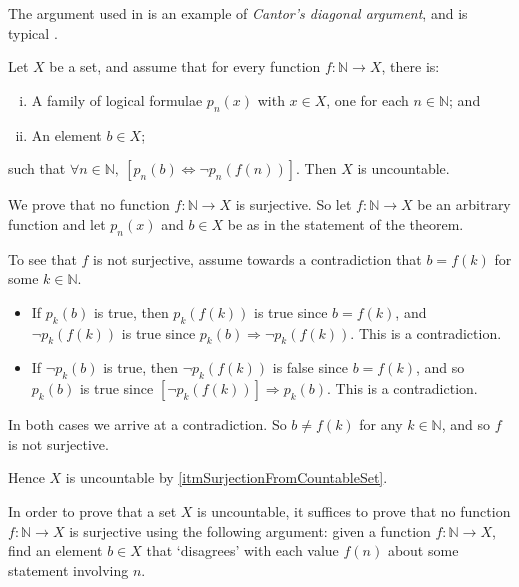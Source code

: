 The argument used in  is an example of \textit{Cantor's diagonal argument}, and is typical .

\begin{theorem}
\label{thmCantorDiagonalGeneral}
Let $X$ be a set, and assume that for every function $f : \mathbb{N} \to X$, there is:
\begin{enumerate}[(i)]
\item A family of logical formulae $p_n(x)$ with $x \in X$, one for each $n \in \mathbb{N}$; and
\item An element $b \in X$;
\end{enumerate}
such that $\forall n \in \mathbb{N},~ [p_n(b) \Leftrightarrow \neg p_n(f(n))]$. Then $X$ is uncountable.
\end{theorem}

\begin{cproof}
We prove that no function $f : \mathbb{N} \to X$ is surjective. So let $f : \mathbb{N} \to X$ be an arbitrary function and let $p_n(x)$ and $b \in X$ be as in the statement of the theorem.

To see that $f$ is not surjective, assume towards a contradiction that $b=f(k)$ for some $k \in \mathbb{N}$.
\begin{itemize}
\item If $p_k(b)$ is true, then $p_k(f(k))$ is true since $b=f(k)$, and $\neg p_k(f(k))$ is true since $p_k(b) \Rightarrow \neg p_k(f(k))$. This is a contradiction.
\item If $\neg p_k(b)$ is true, then $\neg p_k(f(k))$ is false since $b=f(k)$, and so $p_k(b)$ is true since $[\neg p_k(f(k))] \Rightarrow p_k(b)$. This is a contradiction. 
\end{itemize}
In both cases we arrive at a contradiction. So $b \ne f(k)$ for any $k \in \mathbb{N}$, and so $f$ is not surjective.

Hence $X$ is uncountable by \ref{itmSurjectionFromCountableSet}.
\end{cproof}

\begin{strategy}
\label{strCantorDiagonal}
In order to prove that a set $X$ is uncountable, it suffices to prove that no function $f : \mathbb{N} \to X$ is surjective using the following argument: given a function $f : \mathbb{N} \to X$, find an element $b \in X$ that `disagrees' with each value $f(n)$ about some statement involving $n$.
\end{strategy}


